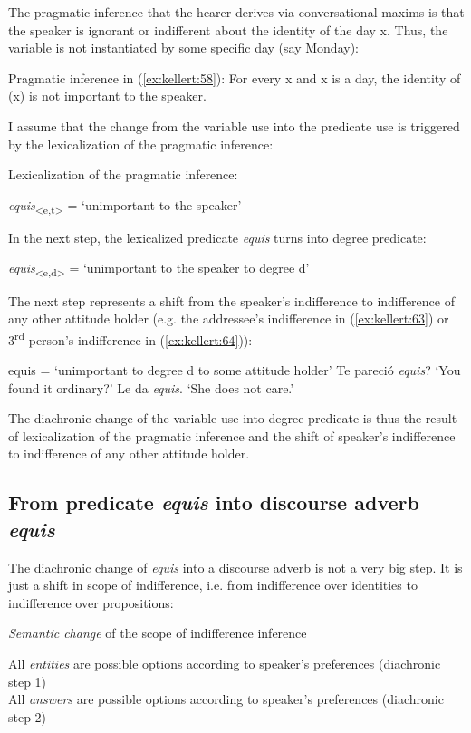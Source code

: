 \documentclass[output=paper]{langsci/langscibook}
\begin{document}
The pragmatic inference that the hearer derives via conversational maxims is that the speaker is ignorant or indifferent about the identity of the day x. Thus, the variable is not instantiated by some specific day (say Monday):

\ea\label{ex:kellert:59} Pragmatic inference in (\ref{ex:kellert:58}): For every x and x is a day, the identity of (x) is not important to the speaker.
\z

I assume that the change from the variable use into the predicate use is triggered by the lexicalization of the pragmatic inference:

\ea\label{ex:kellert:60} Lexicalization of the pragmatic inference:\par
	\textit{equis}\textsubscript{<e,t>} = ‘unimportant to the speaker’
\z

In the next step, the lexicalized predicate \textit{equis} turns into degree predicate:

\ea\label{ex:kellert:} \textit{equis}\textsubscript{<e,d>} = ‘unimportant to the speaker to degree d’
\z

The next step represents a shift from the speaker’s indifference to indifference of any other attitude holder (e.g. the addressee’s indifference in (\ref{ex:kellert:63}) or 3\textsuperscript{rd} person’s indifference in (\ref{ex:kellert:64})):

\ea\label{ex:kellert:64}	equis = ‘unimportant to degree d to some attitude holder’
\ex\label{ex:kellert:63}  Te pareció \textit{equis}? ‘You found it ordinary?’
\ex  Le da \textit{equis}. ‘She does not care.’
\z

The diachronic change of the variable use into degree predicate is thus the result of lexicalization of the pragmatic inference and the shift of speaker’s indifference to indifference of any other attitude holder.


\subsection{From predicate \textit{equis} into discourse adverb \textit{equis}}\label{sec:kellert:4.2}
The diachronic change of \textit{equis} into a discourse adverb is not a very big step. It is just a shift in scope of indifference, i.e. from indifference over identities to indifference over propositions:

\ea\label{ex:kellert:65} \textit{Semantic change} of the scope of indifference inference\\
\begin{xlist}
\ex All \textit{entities} are possible options according to speaker’s preferences (diachronic step 1)\\
\ex All \textit{answers} are possible options according to speaker’s preferences (diachronic step 2)
\end{xlist}
\z
\end{document}
